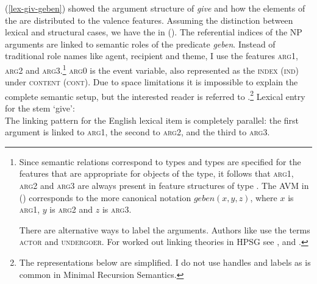 (\ref{lex-giv-geben}) showed the argument structure of \emph{give} and how the elements of the
\argstl are distributed to the valence features. Assuming the distinction between lexical and
structural cases, we have the \argstv in (). The referential indices of the NP arguments are
linked to semantic roles of the predicate \emph{geben}. Instead of traditional role names like
agent, recipient and theme, I use the features \textsc{arg1}, \textsc{arg2} and
\textsc{arg3}.\footnote{%
Since semantic relations correspond to types and types are specified for the features that are
appropriate for objects of the type, it follows that \textsc{arg1}, \textsc{arg2} and \textsc{arg3} are always
present in feature structures of type . The AVM in () corresponds to the more
canonical notation $geben(x,y,z)$, where $x$ is \textsc{arg1}, $y$ is \textsc{arg2} and $z$ is \textsc{arg3}. 

There are alternative ways to label
the arguments. Authors like  use the terms \textsc{actor} and \textsc{undergoer}. For worked out
linking theories in HPSG see ,  and .
}
\textsc{arg0} is the event variable, also represented as the \textsc{index}
(\textsc{ind}) under \textsc{content} (\textsc{cont}). Due to space limitations it is impossible to
explain the complete semantic setup, but the interested reader is referred to
.\footnote{%
  The representations below are simplified. I do not use handles and labels as is common in Minimal
  Recursion Semantics.
}
\eas 
Lexical entry for the stem  `give':\\
\zs
The linking pattern for the English lexical item is completely parallel: the first argument is
linked to \textsc{arg1}, the second to \textsc{arg2}, and the third to \textsc{arg3}.

